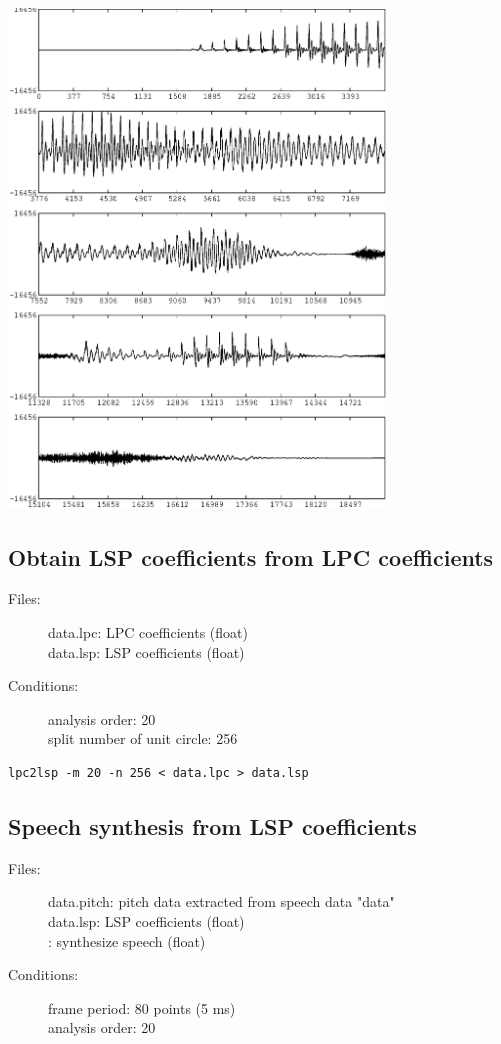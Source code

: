 \documentclass[a4paper,10pt]{article}
\begin{document}
\includegraphics[width=10cm]{eps/data.par.syn.gwave.eps}

\subsection{Obtain LSP coefficients from LPC coefficients}
\begin{description}
\item[Files:]
   data.lpc: LPC coefficients (float)\\
   data.lsp: LSP coefficients (float)
\item[Conditions:]
  analysis order: 20\\
  split number of unit circle: 256
\end{description}

\begin{verbatim}
lpc2lsp -m 20 -n 256 < data.lpc > data.lsp
\end{verbatim}

\subsection{Speech synthesis from LSP coefficients}

\begin{description}
\item[Files:]
  data.pitch: pitch data extracted from speech data "data"\\
  data.lsp: LSP coefficients (float)\\
  :
  synthesize speech (float)
\item[Conditions:]
  frame period: 80 points (5 ms)\\
  analysis order: 20
\end{description}
\end{document}
